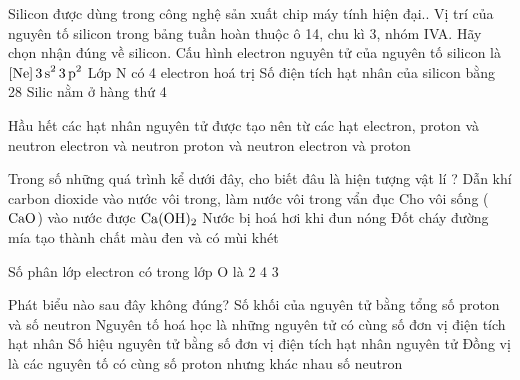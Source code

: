 \documentclass[11pt,a4paper]{article}
\begin{document}
\begin{ex}
Silicon được dùng trong công nghệ sản xuất chip máy tính hiện đại.. Vị trí của nguyên tố silicon trong bảng tuần hoàn thuộc ô 14, chu kì 3, nhóm IVA. Hãy chọn nhận đúng về silicon.
\choice
{\True Cấu hình electron nguyên tử của nguyên tố silicon là $\ce{[Ne] 3s^2 3p^2}$}
{Lớp N có 4 electron hoá trị}
{Số điện tích hạt nhân của silicon bằng 28}
{Silic nằm ở hàng thứ 4}

\end{ex}
\begin{ex}
Hầu hết các hạt nhân nguyên tử được tạo nên từ các hạt
\choice
{electron, proton và neutron}
{electron và neutron}
{\True proton và neutron}
{electron và proton}

\end{ex}
\begin{ex}
Trong số những quá trình kể dưới đây, cho biết đâu là hiện tượng vật lí ?
\choice
{Dẫn khí carbon dioxide vào nước vôi trong, làm nước vôi trong vẩn đục}
{Cho vôi sống ($\ce{CaO}$) vào nước được $\ce{Ca(OH)2}$}
{\True Nước bị hoá hơi khi đun nóng}
{Đốt cháy đường mía tạo thành chất màu đen và có mùi khét}

\end{ex}
\begin{ex}
Số phân lớp electron có trong lớp O là
\choice
{2}
{4}
{3}
{}

\end{ex}
\begin{ex}
Phát biểu nào sau đây không đúng?
\choice
{Số khối của nguyên tử bằng tổng số proton và số neutron}
{Nguyên tố hoá học là những nguyên tử có cùng số đơn vị điện tích hạt nhân}
{Số hiệu nguyên tử bằng số đơn vị điện tích hạt nhân nguyên tử}
{\True Đồng vị là các nguyên tố có cùng số proton nhưng khác nhau số neutron}

\end{ex}
\end{document}
